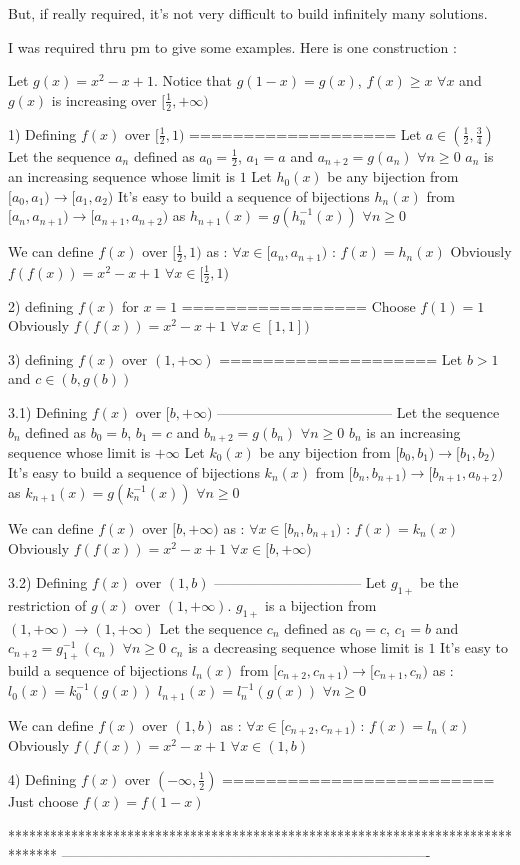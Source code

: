 \begin{solution}
	\begin{tcolorbox}But, if really required,  it's not very difficult to build infinitely many solutions.\end{tcolorbox}
I was required thru pm to give some examples. Here is one construction :

Let $g(x)=x^2-x+1$. Notice that $g(1-x)=g(x)$, $f(x)\ge x$ $\forall x$ and $g(x)$ is increasing over $[\frac 12, +\infty)$

1) Defining $f(x)$ over $[\frac 12, 1)$
===================
Let $a\in(\frac 12,\frac 34)$
Let the sequence $a_n$ defined as $a_0=\frac 12$, $a_1=a$ and $a_{n+2}=g(a_n)$ $\forall n\ge 0$
$a_n$ is an increasing sequence whose limit is $1$
Let $h_0(x)$ be any bijection from $[a_0,a_1)\to [a_1,a_2)$
It's easy to build a sequence of bijections $h_n(x)$ from $[a_n,a_{n+1})\to[a_{n+1},a_{n+2})$ as $h_{n+1}(x)=g(h_n^{-1}(x))$ $\forall n\ge 0$

We can define $f(x)$ over $[\frac 12,1)$ as :
$\forall x\in [a_n,a_{n+1})$ : $f(x)=h_n(x)$
Obviously $f(f(x))=x^2-x+1$ $\forall x\in [\frac 12, 1)$

2) defining $f(x)$ for $x=1$
=================
Choose $f(1)=1$
Obviously $f(f(x))=x^2-x+1$ $\forall x\in [1,1])$

3) defining $f(x)$ over $(1,+\infty)$
====================
Let $b>1$ and $c\in(b,g(b))$

3.1) Defining $f(x)$ over $[b,+\infty)$
--------------------------------------
Let the sequence $b_n$ defined as $b_0=b$, $b_1=c$ and $b_{n+2}=g(b_n)$ $\forall n\ge 0$
$b_n$ is an increasing sequence whose limit is $+\infty$
Let $k_0(x)$ be any bijection from $[b_0,b_1)\to [b_1,b_2)$
It's easy to build a sequence of bijections $k_n(x)$ from $[b_n,b_{n+1})\to[b_{n+1},a_{b+2})$ as $k_{n+1}(x)=g(k_n^{-1}(x))$ $\forall n\ge 0$

We can define $f(x)$ over $[b,+\infty)$ as :
$\forall x\in [b_n,b_{n+1})$ : $f(x)=k_n(x)$
Obviously $f(f(x))=x^2-x+1$ $\forall x\in [b,+\infty)$

3.2) Defining $f(x)$ over $(1,b)$
--------------------------------
Let $g_{1+}$ be the restriction of $g(x)$ over $(1,+\infty)$. $g_{1+}$ is a bijection from $(1,+\infty)\to(1,+\infty)$
Let the sequence $c_n$ defined as $c_0=c$, $c_1=b$ and $c_{n+2}=g_{1+}^{-1}(c_n)$ $\forall n\ge 0$
$c_n$ is a decreasing sequence whose limit is $1$
It's easy to build a sequence of bijections $l_n(x)$ from $[c_{n+2},c_{n+1})\to[c_{n+1},c_n)$ as :
$l_0(x)=k_0^{-1}(g(x))$ $l_{n+1}(x)=l_n^{-1}(g(x))$ $\forall n\ge 0$

We can define $f(x)$ over $(1,b)$ as :
$\forall x\in [c_{n+2},c_{n+1})$ : $f(x)=l_n(x)$
Obviously $f(f(x))=x^2-x+1$ $\forall x\in (1,b)$

4) Defining $f(x)$ over $(-\infty,\frac 12)$
=========================
Just choose $f(x)=f(1-x)$
\end{solution}
*******************************************************************************
-------------------------------------------------------------------------------

